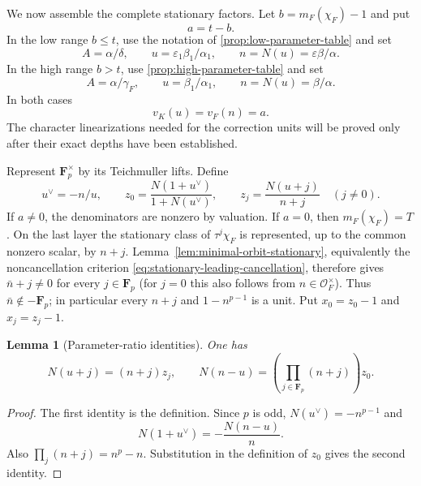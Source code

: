 \documentclass[11pt]{amsart}
\newtheorem{lemma}[theorem]{Lemma}
\theoremstyle{definition}
\theoremstyle{remark}
\newcommand{\F}{\mathbf F}
\newcommand{\cO}{\mathcal O}
\newcommand{\eps}{\varepsilon}
\begin{document}
We now assemble the complete stationary factors.  Let
$b=m_F(\chi_F)-1$ and put
\begin{equation}\label{eq:a-def}
 a=t-b.
\end{equation}
In the low range $b\le t$, use the notation of
\cref{prop:low-parameter-table} and set
\begin{equation}\label{eq:A-u-low}
 A=\alpha/\delta,
 \qquad u=\eps_1\beta_1/\alpha_1,
 \qquad n=N(u)=\eps\beta/\alpha.
\end{equation}
In the high range $b>t$, use \cref{prop:high-parameter-table} and set
\begin{equation}\label{eq:A-u-high}
 A=\alpha/\gamma_F,
 \qquad u=\beta_1/\alpha_1,
 \qquad n=N(u)=\beta/\alpha.
\end{equation}
In both cases
\begin{equation}\label{eq:a-valuations}
 v_K(u)=v_F(n)=a.
\end{equation}
The character linearizations needed for the correction units will be
proved only after their exact depths have been established.

Represent $\F_p^\times$ by its Teichmuller lifts.  Define
\begin{equation}\label{eq:correction-units}
 u^\vee=-n/u,
 \qquad
 z_0=\frac{N(1+u^\vee)}{1+N(u^\vee)},
 \qquad
 z_j=\frac{N(u+j)}{n+j}\quad(j\ne0).
\end{equation}
If $a\ne0$, the denominators are nonzero by valuation.  If $a=0$,
then $m_F(\chi_F)=T$.  On the last layer the stationary class of
$\tau^j\chi_F$ is represented, up to the common nonzero scalar, by
$n+j$.  Lemma~\ref{lem:minimal-orbit-stationary}, equivalently the
noncancellation criterion
\eqref{eq:stationary-leading-cancellation}, therefore gives
$\bar n+j\ne0$ for every $j\in\F_p$ (for $j=0$ this also follows from
$n\in\cO_F^\times$).  Thus $\bar n\notin-\F_p$; in particular every
$n+j$ and $1-n^{p-1}$ is a unit.  Put $x_0=z_0-1$ and $x_j=z_j-1$.

\begin{lemma}[Parameter-ratio identities]\label{lem:parameter-ratios}
One has
\begin{equation}\label{eq:parameter-ratios}
 N(u+j)=(n+j)z_j,
 \qquad
 N(n-u)=\left(\prod_{j\in\F_p}(n+j)\right)z_0.
\end{equation}
\end{lemma}

\begin{proof}
The first identity is the definition.  Since $p$ is odd,
$N(u^\vee)=-n^{p-1}$ and
\[
 N(1+u^\vee)=-\frac{N(n-u)}n.
\]
Also $\prod_j(n+j)=n^p-n$.  Substitution in the definition of $z_0$
gives the second identity.
\end{proof}
\end{document}
